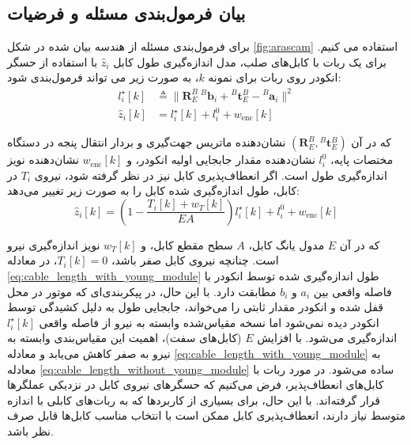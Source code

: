 \subsection{بیان فرمول‌بندی مسئله و فرضیات}
برای فرمول‌بندی مسئله از هندسه بیان شده در شکل 
\ref{fig:arascam}
استفاده می کنیم. برای یک ربات با کابل‌های صلب، مدل اندازه‌گیری طول کابل \( \hat{z}_i \) با استفاده از حسگر انکودر روی ربات برای نمونه $k$، به صورت زیر می تواند فرمول‌بندی ‌شود:
\begin{equation}\label{eq:cable_length_without_young_module}
	\begin{split}
		l^\star_i [k] &\triangleq \| \boldsymbol{R}^B_E ~ {}^B\!\boldsymbol{b}_i + {}^B\!\boldsymbol{t}_E^B - {}^B\!\boldsymbol{a}_i \|^2 \\
		\hat{z}_i [k] &= l^\star_i [k] + l_{i}^0 + w_{\text{enc}} [k]
	\end{split}
\end{equation}


که در آن
\( (\boldsymbol{R}^B_E, {}^B\!\boldsymbol{t}_E^B) \)
 نشان‌دهنده ماتریس جهت‌گیری و بردار انتقال پنجه در دستگاه مختصات پایه،
\(l_{i}^0  \)
نشان‌دهنده مقدار جابجایی اولیه انکودر، و 
\( w_{\text{enc}} [k] \)
 نشان‌دهنده نویز اندازه‌گیری طول است. اگر انعطاف‌پذیری کابل نیز در نظر گرفته شود، نیروی
\( T_i \)
 در کابل، طول اندازه‌گیری شده کابل را به صورت زیر تغییر می‌دهد:
\begin{equation} \label{eq:cable_length_with_young_module}
	\hat{z}_i [k] = \left(1 - \frac{T_i [k] + w_T [k]}{EA} \right) l^\star_i [k] + l_{i}^0 + w_{\text{enc}} [k]
\end{equation}


که در آن \( E \) مدول یانگ کابل، \( A \) سطح مقطع کابل، و \( w_T [k] \) نویز اندازه‌گیری نیرو است. چنانچه نیروی کابل صفر باشد،
\( T_i [k] = 0 \)، 
در معادله 
\ref{eq:cable_length_with_young_module}
 طول اندازه‌گیری شده توسط انکودر با فاصله واقعی بین \( a_i \) و \( b_i \) مطابقت دارد. با این حال، در پیکربندی‌ای که موتور در محل قفل شده و انکودر مقدار ثابتی را می‌خواند، جابجایی طول به دلیل کشیدگی توسط انکودر دیده نمی‌شود اما نسخه مقیاس‌شده وابسته به نیرو از فاصله واقعی \( l^\star_i [k] \) اندازه‌گیری می‌شود. با افزایش \( E \) (کابل‌های سفت)، اهمیت این مقیاس‌بندی وابسته به نیرو به صفر کاهش می‌یابد و معادله 
\ref{eq:cable_length_with_young_module}
به معادله
\ref{eq:cable_length_without_young_module}
 ساده می‌شود. در مورد ربات‌ با کابل‌های انعطاف‌پذیر، فرض می‌کنیم که حسگرهای نیروی کابل در نزدیکی عملگرها قرار گرفته‌اند. با این حال، برای بسیاری از کاربردها که به ربات‌های کابلی با اندازه متوسط نیاز دارند، انعطاف‌پذیری کابل ممکن است با انتخاب مناسب کابل‌ها قابل صرف نظر باشد.

